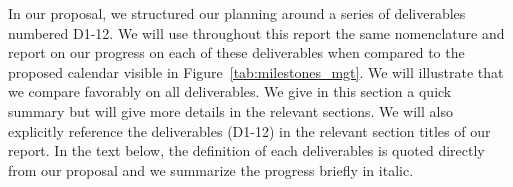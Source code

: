 
\begin{summary}
In our proposal, we structured our planning around a series of deliverables
numbered D1-12. We will use throughout this report the same nomenclature and
report on our progress on each of these deliverables when compared to the
proposed calendar visible in Figure~\ref{tab:milestones_mgt}. We will
illustrate that we compare favorably on all deliverables. We give in this section a quick summary but will give more details in the relevant sections. We will also
explicitly reference  the deliverables (D1-12) in the relevant section titles of our report. In the text below, the definition of each deliverables is quoted directly from our proposal and we summarize the progress briefly in italic.
\end{summary}






